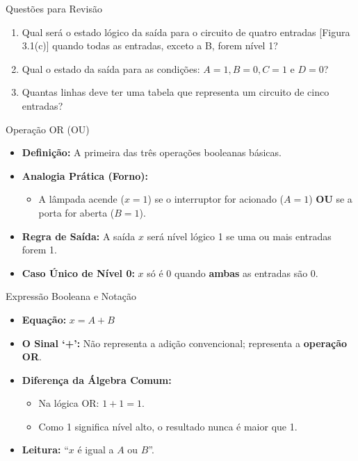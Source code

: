 \begin{frame}{Questões para Revisão}
    \begin{enumerate}
        \item Qual será o estado lógico da saída para o circuito de quatro entradas [Figura 3.1(c)] quando todas as entradas, exceto a B, forem nível 1?
        \item Qual o estado da saída para as condições: $A=1, B=0, C=1$ e $D=0$?
        \item Quantas linhas deve ter uma tabela que representa um circuito de cinco entradas?
    \end{enumerate}
\end{frame}

\begin{frame}{Operação OR (OU)}
    \begin{itemize}
        \item \textbf{Definição:} A primeira das três operações booleanas básicas.
        \item \textbf{Analogia Prática (Forno):}
              \begin{itemize}
                  \item A lâmpada acende ($x=1$) se o interruptor for acionado ($A=1$) \textbf{OU} se a porta for aberta ($B=1$).
              \end{itemize}
        \item \textbf{Regra de Saída:} A saída $x$ será nível lógico 1 se uma ou mais entradas forem 1.
        \item \textbf{Caso Único de Nível 0:} $x$ só é 0 quando \textbf{ambas} as entradas são 0.
    \end{itemize}
\end{frame}

\begin{frame}{Expressão Booleana e Notação}
    \begin{itemize}
        \item \textbf{Equação:} $x = A + B$
        \item \textbf{O Sinal ‘+’:} Não representa a adição convencional; representa a \textbf{operação OR}.
        \item \textbf{Diferença da Álgebra Comum:}
              \begin{itemize}
                  \item Na lógica OR: $1 + 1 = 1$.
                  \item Como 1 significa nível alto, o resultado nunca é maior que 1.
              \end{itemize}
        \item \textbf{Leitura:} “$x$ é igual a $A$ ou $B$”.
    \end{itemize}
\end{frame}

